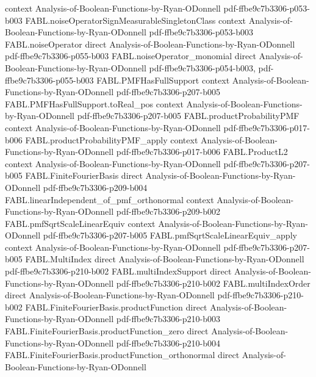 \begin{theorem}
  {context}
  {Analysis-of-Boolean-Functions-by-Ryan-ODonnell}
  {pdf-ffbe9c7b3306-p053-b003}
\proofstep
  {FABL.noiseOperatorSignMeasurableSingletonClass}
  {context}
  {Analysis-of-Boolean-Functions-by-Ryan-ODonnell}
  {pdf-ffbe9c7b3306-p053-b003}
\proofstep
  {FABL.noiseOperator}
  {direct}
  {Analysis-of-Boolean-Functions-by-Ryan-ODonnell}
  {pdf-ffbe9c7b3306-p055-b003}
\proofstep
  {FABL.noiseOperator_monomial}
  {direct}
  {Analysis-of-Boolean-Functions-by-Ryan-ODonnell}
  {pdf-ffbe9c7b3306-p054-b003,
    pdf-ffbe9c7b3306-p055-b003}
\proofstep
  {FABL.PMFHasFullSupport}
  {context}
  {Analysis-of-Boolean-Functions-by-Ryan-ODonnell}
  {pdf-ffbe9c7b3306-p207-b005}
\proofstep
  {FABL.PMFHasFullSupport.toReal_pos}
  {context}
  {Analysis-of-Boolean-Functions-by-Ryan-ODonnell}
  {pdf-ffbe9c7b3306-p207-b005}
\proofstep
  {FABL.productProbabilityPMF}
  {context}
  {Analysis-of-Boolean-Functions-by-Ryan-ODonnell}
  {pdf-ffbe9c7b3306-p017-b006}
\proofstep
  {FABL.productProbabilityPMF_apply}
  {context}
  {Analysis-of-Boolean-Functions-by-Ryan-ODonnell}
  {pdf-ffbe9c7b3306-p017-b006}
\proofstep
  {FABL.ProductL2}
  {context}
  {Analysis-of-Boolean-Functions-by-Ryan-ODonnell}
  {pdf-ffbe9c7b3306-p207-b005}
\proofstep
  {FABL.FiniteFourierBasis}
  {direct}
  {Analysis-of-Boolean-Functions-by-Ryan-ODonnell}
  {pdf-ffbe9c7b3306-p209-b004}
\proofstep
  {FABL.linearIndependent_of_pmf_orthonormal}
  {context}
  {Analysis-of-Boolean-Functions-by-Ryan-ODonnell}
  {pdf-ffbe9c7b3306-p209-b002}
\proofstep
  {FABL.pmfSqrtScaleLinearEquiv}
  {context}
  {Analysis-of-Boolean-Functions-by-Ryan-ODonnell}
  {pdf-ffbe9c7b3306-p207-b005}
\proofstep
  {FABL.pmfSqrtScaleLinearEquiv_apply}
  {context}
  {Analysis-of-Boolean-Functions-by-Ryan-ODonnell}
  {pdf-ffbe9c7b3306-p207-b005}
\proofstep
  {FABL.MultiIndex}
  {direct}
  {Analysis-of-Boolean-Functions-by-Ryan-ODonnell}
  {pdf-ffbe9c7b3306-p210-b002}
\proofstep
  {FABL.multiIndexSupport}
  {direct}
  {Analysis-of-Boolean-Functions-by-Ryan-ODonnell}
  {pdf-ffbe9c7b3306-p210-b002}
\proofstep
  {FABL.multiIndexOrder}
  {direct}
  {Analysis-of-Boolean-Functions-by-Ryan-ODonnell}
  {pdf-ffbe9c7b3306-p210-b002}
\proofstep
  {FABL.FiniteFourierBasis.productFunction}
  {direct}
  {Analysis-of-Boolean-Functions-by-Ryan-ODonnell}
  {pdf-ffbe9c7b3306-p210-b003}
\proofstep
  {FABL.FiniteFourierBasis.productFunction_zero}
  {direct}
  {Analysis-of-Boolean-Functions-by-Ryan-ODonnell}
  {pdf-ffbe9c7b3306-p210-b004}
\proofstep
  {FABL.FiniteFourierBasis.productFunction_orthonormal}
  {direct}
  {Analysis-of-Boolean-Functions-by-Ryan-ODonnell}

\end{theorem}
